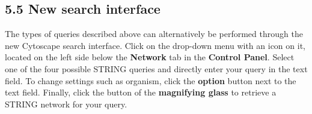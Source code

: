 \documentclass[a4paper]{article}
\begin{document}
\subsection*{5.5 New search interface}
The types of queries described above can alternatively be performed through the new Cytoscape search interface. Click on the drop-down menu with an icon on it, located on the left side below the \textbf{Network} tab in the \textbf{Control Panel}. Select one of the four possible STRING queries and directly enter your query in the text field. To change settings such as organism, click the \textbf{option} button next to the text field. Finally, click the button of the \textbf{magnifying glass} to retrieve a STRING network for your query.
\end{document}

